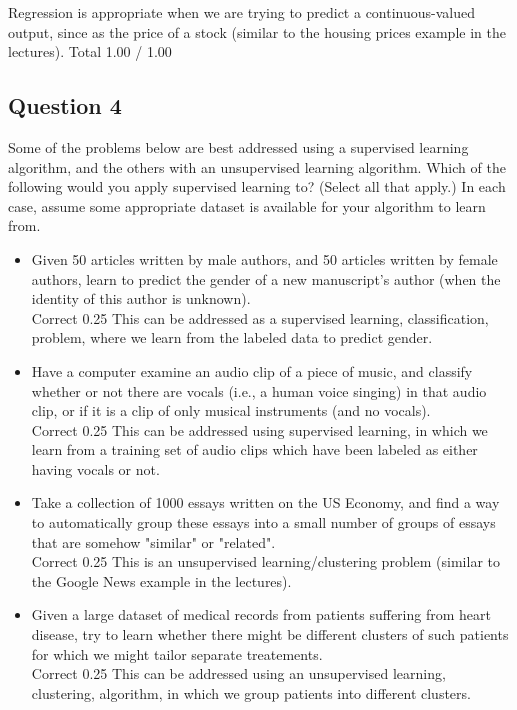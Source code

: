 \begin{itemize}
Regression is appropriate when we are trying to predict a continuous-valued output, since as the price of a stock (similar to the housing prices example in the lectures).
Total		1.00 / 1.00	
\subsection*{Question 4}
Some of the problems below are best addressed using a supervised learning algorithm, and the others with an unsupervised learning algorithm. Which of the following would you apply supervised learning to? (Select all that apply.) In each case, assume some appropriate dataset is available for your algorithm to learn from.


\begin{itemize}
\item Given 50 articles written by male authors, and 50 articles written by female authors, learn to predict the gender of a new manuscript's author (when the identity of this author is unknown).	\\ Correct	0.25	This can be addressed as a supervised learning, classification, problem, where we learn from the labeled data to predict gender.
\item Have a computer examine an audio clip of a piece of music, and classify whether or not there are vocals (i.e., a human voice singing) in that audio clip, or if it is a clip of only musical instruments (and no vocals).	\\Correct	0.25	This can be addressed using supervised learning, in which we learn from a training set of audio clips which have been labeled as either having vocals or not.
\item Take a collection of 1000 essays written on the US Economy, and find a way to automatically group these essays into a small number of groups of essays that are somehow "similar" or "related".	\\ Correct	0.25	This is an unsupervised learning/clustering problem (similar to the Google News example in the lectures).
\item Given a large dataset of medical records from patients suffering from heart disease, try to learn whether there might be different clusters of such patients for which we might tailor separate treatements.	\\ Correct	0.25	This can be addressed using an unsupervised learning, clustering, algorithm, in which we group patients into different clusters.
\end{itemize}
	

\end{itemize}
